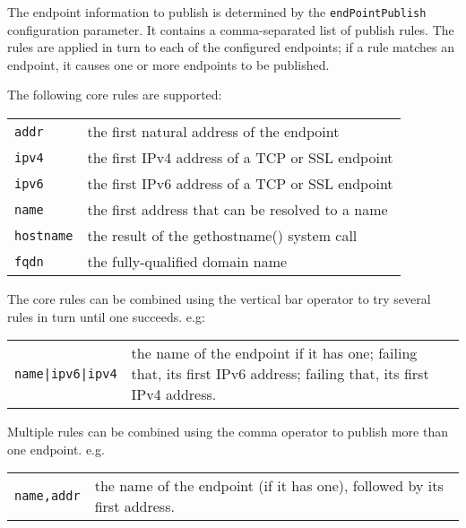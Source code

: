 \documentclass[11pt,oneside,a4paper]{book}
\newcommand{\code}[1]{\texttt{#1}}
\begin{document}
The endpoint information to publish is determined by the
\code{endPointPublish} configuration parameter. It contains a
comma-separated list of publish rules. The rules are applied in turn
to each of the configured endpoints; if a rule matches an endpoint, it
causes one or more endpoints to be published.

The following core rules are supported:

\vspace{\baselineskip}

\begin{tabular}{p{}p{}}
\code{addr} &     the first natural address of the endpoint\\
\code{ipv4} &     the first IPv4 address of a TCP or SSL endpoint\\
\code{ipv6} &     the first IPv6 address of a TCP or SSL endpoint\\
\code{name} &     the first address that can be resolved to a name\\
\code{hostname} & the result of the gethostname() system call\\
\code{fqdn} &     the fully-qualified domain name\\
\end{tabular}

\vspace{\baselineskip}

\noindent
The core rules can be combined using the vertical bar operator to
try several rules in turn until one succeeds. e.g:

\vspace{\baselineskip}

\begin{tabular}{p{}p{}}
\code{name|ipv6|ipv4} & the name of the endpoint if it has one;
                 	failing that, its first IPv6 address;
                 	failing that, its first IPv4 address.
\end{tabular}

\vspace{\baselineskip}

\noindent
Multiple rules can be combined using the comma operator to
publish more than one endpoint. e.g.

\vspace{\baselineskip}

\begin{tabular}{p{}p{}}
\code{name,addr} & the name of the endpoint (if it has one),
                   followed by its first address.
\end{tabular}
\end{document}
